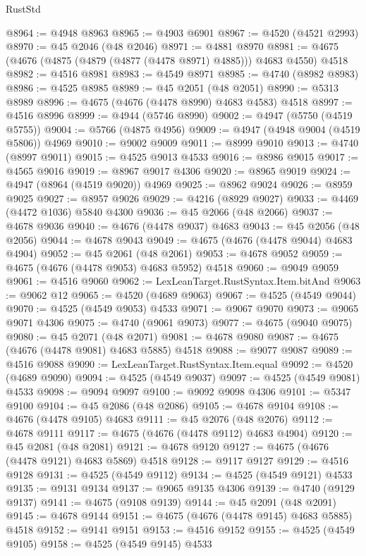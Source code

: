 \begin{lexlean}{RustStd}
\begin{coremodule}
@8964 := @4948 @8963
@8965 := @4903 @6901
@8967 := @4520 (@4521 @2993)
@8970 := @45 @2046 (@48 @2046)
@8971 := @4881 @8970
@8981 := @4675 (@4676 (@4875 (@4879 (@4877 (@4478 @8971) @4885))) @4683 @4550) @4518
@8982 := @4516 @8981
@8983 := @4549 @8971
@8985 := @4740 (@8982 @8983)
@8986 := @4525 @8985
@8989 := @45 @2051 (@48 @2051)
@8990 := @5313 @8989
@8996 := @4675 (@4676 (@4478 @8990) @4683 @4583) @4518
@8997 := @4516 @8996
@8999 := @4944 (@5746 @8990)
@9002 := @4947 (@5750 (@4519 @5755))
@9004 := @5766 (@4875 @4956)
@9009 := @4947 (@4948 @9004 (@4519 @5806)) @4969
@9010 := @9002 @9009
@9011 := @8999 @9010
@9013 := @4740 (@8997 @9011)
@9015 := @4525 @9013 @4533
@9016 := @8986 @9015
@9017 := @4565 @9016
@9019 := @8967 @9017 @4306
@9020 := @8965 @9019
@9024 := @4947 (@8964 (@4519 @9020)) @4969
@9025 := @8962 @9024
@9026 := @8959 @9025
@9027 := @8957 @9026
@9029 := @4216 (@8929 @9027)
@9033 := @4469 (@4472 @1036) @5840 @4300
@9036 := @45 @2066 (@48 @2066)
@9037 := @4678 @9036
@9040 := @4676 (@4478 @9037) @4683
@9043 := @45 @2056 (@48 @2056)
@9044 := @4678 @9043
@9049 := @4675 (@4676 (@4478 @9044) @4683 @4904)
@9052 := @45 @2061 (@48 @2061)
@9053 := @4678 @9052
@9059 := @4675 (@4676 (@4478 @9053) @4683 @5952) @4518
@9060 := @9049 @9059
@9061 := @4516 @9060
@9062 := LexLeanTarget.RustSyntax.Item.bitAnd
@9063 := @9062 @12
@9065 := @4520 (@4689 @9063)
@9067 := @4525 (@4549 @9044)
@9070 := @4525 (@4549 @9053) @4533
@9071 := @9067 @9070
@9073 := @9065 @9071 @4306
@9075 := @4740 (@9061 @9073)
@9077 := @4675 (@9040 @9075)
@9080 := @45 @2071 (@48 @2071)
@9081 := @4678 @9080
@9087 := @4675 (@4676 (@4478 @9081) @4683 @5885) @4518
@9088 := @9077 @9087
@9089 := @4516 @9088
@9090 := LexLeanTarget.RustSyntax.Item.equal
@9092 := @4520 (@4689 @9090)
@9094 := @4525 (@4549 @9037)
@9097 := @4525 (@4549 @9081) @4533
@9098 := @9094 @9097
@9100 := @9092 @9098 @4306
@9101 := @5347 @9100
@9104 := @45 @2086 (@48 @2086)
@9105 := @4678 @9104
@9108 := @4676 (@4478 @9105) @4683
@9111 := @45 @2076 (@48 @2076)
@9112 := @4678 @9111
@9117 := @4675 (@4676 (@4478 @9112) @4683 @4904)
@9120 := @45 @2081 (@48 @2081)
@9121 := @4678 @9120
@9127 := @4675 (@4676 (@4478 @9121) @4683 @5869) @4518
@9128 := @9117 @9127
@9129 := @4516 @9128
@9131 := @4525 (@4549 @9112)
@9134 := @4525 (@4549 @9121) @4533
@9135 := @9131 @9134
@9137 := @9065 @9135 @4306
@9139 := @4740 (@9129 @9137)
@9141 := @4675 (@9108 @9139)
@9144 := @45 @2091 (@48 @2091)
@9145 := @4678 @9144
@9151 := @4675 (@4676 (@4478 @9145) @4683 @5885) @4518
@9152 := @9141 @9151
@9153 := @4516 @9152
@9155 := @4525 (@4549 @9105)
@9158 := @4525 (@4549 @9145) @4533

\end{coremodule}
\end{lexlean}
